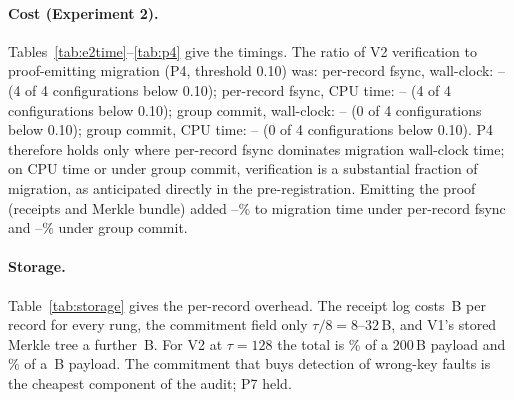 \paragraph{Cost (Experiment 2).} Tables~\ref{tab:e2time}--\ref{tab:p4} give the timings.
The ratio of V2 verification to proof-emitting migration (P4, threshold 0.10) was: per-record fsync, wall-clock: \akmPfourperrecordwallsmin{}--\akmPfourperrecordwallsmax{} (4 of 4 configurations below 0.10); per-record fsync, CPU time: \akmPfourperrecordcpusmin{}--\akmPfourperrecordcpusmax{} (4 of 4 configurations below 0.10); group commit, wall-clock: \akmPfourgroupOneZeroZeroZerowallsmin{}--\akmPfourgroupOneZeroZeroZerowallsmax{} (0 of 4 configurations below 0.10); group commit, CPU time: \akmPfourgroupOneZeroZeroZerocpusmin{}--\akmPfourgroupOneZeroZeroZerocpusmax{} (0 of 4 configurations below 0.10).
P4 therefore holds only where per-record fsync dominates migration wall-clock time; on CPU time or under group commit, verification is a substantial fraction of migration, as anticipated directly in the pre-registration.
Emitting the proof (receipts and Merkle bundle) added \akmOverheadRecMin{}--\akmOverheadRecMax{}\% to migration time under per-record fsync and \akmOverheadGrpMin{}--\akmOverheadGrpMax{}\% under group commit.

\paragraph{Storage.} Table~\ref{tab:storage} gives the per-record overhead.
The receipt log costs \akmReceiptBytes{}\,B per record for every rung, the commitment field only $\tau/8 = 8$--$32$\,B, and V1's stored Merkle tree a further \akmTreeBytes{}\,B.
For V2 at $\tau=128$ the total is \akmVtwoPctSmall{}\% of a 200\,B payload and \akmVtwoPctLarge{}\% of a \akmLargeSize{}\,B payload.
The commitment that buys detection of wrong-key faults is the cheapest component of the audit; P7 held.






